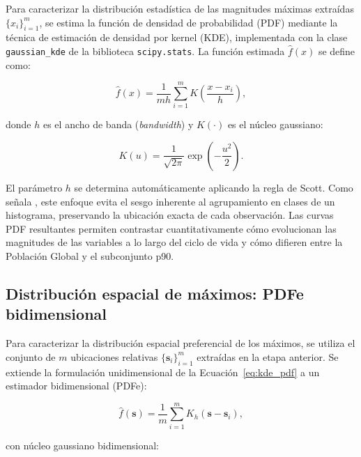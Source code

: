 Para caracterizar la distribución estadística de las magnitudes máximas extraídas $\{x_i\}_{i=1}^{m}$, se estima la función de densidad de probabilidad (PDF) mediante la técnica de estimación de densidad por kernel (KDE), implementada con la clase \texttt{gaussian\_kde} de la biblioteca \texttt{scipy.stats}. La función estimada $\hat{f}(x)$ se define como:

\begin{equation}
    \hat{f}(x) = \frac{1}{m h} \sum_{i=1}^{m} K\!\left(\frac{x - x_i}{h}\right),
\label{eq:kde_pdf}
\end{equation}

donde $h$ es el ancho de banda (\textit{bandwidth}) y $K(\cdot)$ es el núcleo gaussiano:

\begin{equation}
    K(u) = \frac{1}{\sqrt{2\pi}} \exp\!\left(-\frac{u^2}{2}\right).
\label{eq:gaussian_kernel}
\end{equation}

El parámetro $h$ se determina automáticamente aplicando la regla de Scott. Como señala \citet{weglarczyk2018kernel}, este enfoque evita el sesgo inherente al agrupamiento en clases de un histograma, preservando la ubicación exacta de cada observación. Las curvas PDF resultantes permiten contrastar cuantitativamente cómo evolucionan las magnitudes de las variables a lo largo del ciclo de vida y cómo difieren entre la Población Global y el subconjunto p90.

\subsection{Distribución espacial de máximos: PDFe bidimensional}\label{subsec:kde_localizacion}

Para caracterizar la distribución espacial preferencial de los máximos, se utiliza el conjunto de $m$ ubicaciones relativas $\{\mathbf{s}_i\}_{i=1}^{m}$ extraídas en la etapa anterior. Se extiende la formulación unidimensional de la Ecuación~\ref{eq:kde_pdf} a un estimador bidimensional (PDFe):

\begin{equation}
\hat{f}(\mathbf{s}) = \frac{1}{m} \sum_{i=1}^{m} K_h(\mathbf{s} - \mathbf{s}_i),
\label{eq:kde_simple}
\end{equation}

con núcleo gaussiano bidimensional:

